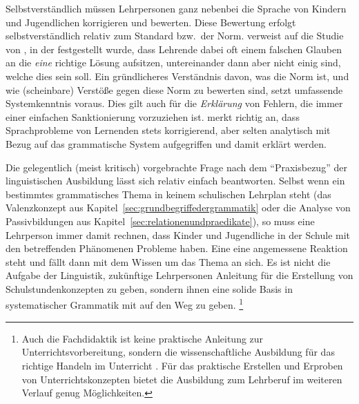 Selbstverständlich müssen Lehrpersonen ganz nebenbei die Sprache von Kindern und Jugendlichen korrigieren und bewerten.
Diese Bewertung erfolgt selbstverständlich relativ zum Standard bzw.\ der Norm.
\citet[7]{Eisenberg2004} verweist auf die Studie von \citet{Braun1979}, in der festgestellt wurde, dass Lehrende dabei oft einem falschen Glauben an die \textit{eine} richtige Lösung aufsitzen, untereinander dann aber nicht einig sind, welche dies sein soll.
Ein gründlicheres Verständnis davon, was die Norm ist, und wie (scheinbare) Verstöße gegen diese Norm zu bewerten sind, setzt umfassende Systemkenntnis voraus.
Dies gilt auch für die \textit{Erklärung} von Fehlern, die immer einer einfachen Sanktionierung vorzuziehen ist.
\citet[10]{Menzel2017} merkt richtig an, dass Sprachprobleme von Lernenden stets korrigierend, aber selten analytisch mit Bezug auf das grammatische System aufgegriffen und damit erklärt werden.

Die gelegentlich (meist kritisch) vorgebrachte Frage nach dem "`Praxisbezug"' der linguistischen Ausbildung lässt sich relativ einfach beantworten.
Selbst wenn ein bestimmtes grammatisches Thema in keinem schulischen Lehrplan steht (\zB das Valenzkonzept aus Kapitel~\ref{sec:grundbegriffedergrammatik} oder die Analyse von Passivbildungen aus Kapitel~\ref{sec:relationenundpraedikate}), so muss eine Lehrperson immer damit rechnen, dass Kinder und Jugendliche in der Schule mit den betreffenden Phänomenen Probleme haben.
Eine eine angemessene Reaktion steht und fällt dann mit dem Wissen um das Thema an sich.
Es ist nicht die Aufgabe der Linguistik, zukünftige Lehrpersonen Anleitung für die Erstellung von Schulstundenkonzepten zu geben, sondern ihnen eine solide Basis in systematischer Grammatik mit auf den Weg zu geben.%
\footnote{Auch die Fachdidaktik ist keine praktische Anleitung zur Unterrichtsvorbereitung, sondern die wissenschaftliche Ausbildung für das richtige Handeln im Unterricht \citep[15]{Bredel2013}.
Für das praktische Erstellen und Erproben von Unterrichtskonzepten bietet die Ausbildung zum Lehrberuf im weiteren Verlauf genug Möglichkeiten.}

